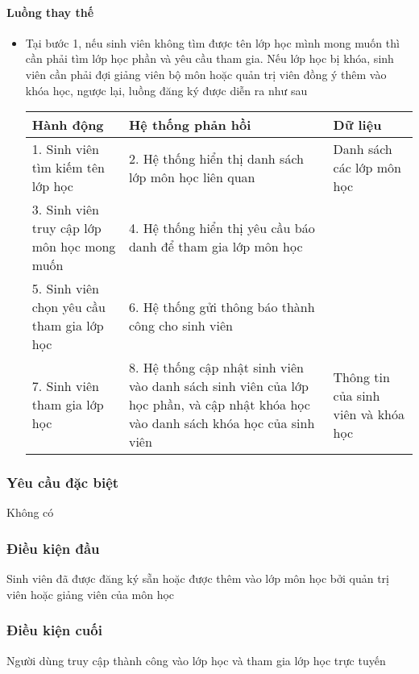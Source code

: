 \documentclass[./../main_file.tex]{subfiles}
\begin{document}
\paragraph{Luồng thay thế}
\begin{itemize}
	\item Tại bước 1, nếu sinh viên không tìm được tên lớp học mình mong muốn thì cần phải tìm lớp học phần và yêu cầu tham gia. Nếu lớp học bị khóa, sinh viên cần phải đợi giảng viên bộ môn hoặc quản trị viên đồng ý thêm vào khóa học, ngược lại, luồng đăng ký được diễn ra như sau
	\begin{table}[H]
					\begin{tabular}{|p{.33\textwidth}|p{}|p{}|}
			\hline
			\textbf{Hành động}                          & \textbf{Hệ thống phản hồi}                                    & \textbf{Dữ liệu}          \\ \hline
			1. Sinh viên tìm kiếm tên lớp học           & 2. Hệ thống hiển thị danh sách lớp môn học liên quan          & Danh sách các lớp môn học \\ \hline
			3. Sinh viên truy cập lớp môn học mong muốn & 4. Hệ thống hiển thị yêu cầu báo danh để tham gia lớp môn học &                           \\ \hline
			5. Sinh viên chọn  yêu cầu tham gia lớp học & 6. Hệ thống gửi thông báo thành công cho sinh viên            &                           \\ \hline
			7. Sinh viên tham gia lớp học &
			8. Hệ thống cập nhật sinh viên vào danh sách sinh viên của lớp học phần, và cập nhật khóa học vào danh sách khóa học của sinh viên &
			Thông tin của sinh viên và khóa học \\ \hline
		\end{tabular}
	\end{table}
\end{itemize}
\subsubsection{Yêu cầu đặc biệt}
Không có

\subsubsection{Điều kiện đầu}
Sinh viên đã được đăng ký sẵn hoặc được thêm vào lớp môn học bởi quản trị viên hoặc giảng viên của môn học

\subsubsection{Điều kiện cuối}
Người dùng truy cập thành công vào lớp học và tham gia lớp học trực tuyến
\end{document}

